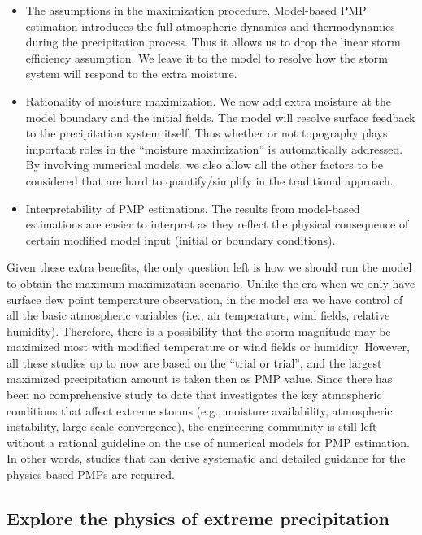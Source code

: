 \begin{itemize}
\item The assumptions in the maximization procedure. Model-based PMP estimation introduces the full atmospheric dynamics and thermodynamics during the precipitation process. Thus it allows us to drop the linear storm efficiency assumption. We leave it to the model to resolve how the storm system will respond to the extra moisture.

\item Rationality of moisture maximization. We now add extra moisture at the model boundary and the initial fields. The model will resolve surface feedback to the precipitation system itself. Thus whether or not topography plays important roles in the ``moisture maximization'' is automatically addressed. By involving numerical models, we also allow all the other factors to be considered that are hard to quantify/simplify in the traditional approach.

\item Interpretability of PMP estimations. The results from model-based estimations are easier to interpret as they reflect the physical consequence of certain modified model input (initial or boundary conditions).
\end{itemize}

Given these extra benefits, the only question left is how we should run the model to obtain the maximum maximization scenario. Unlike the era when we only have surface dew point temperature observation, in the model era we have control of all the basic atmospheric variables (i.e., air temperature, wind fields, relative humidity). Therefore, there is a possibility that the storm magnitude may be maximized most with modified temperature or wind fields or humidity. However, all these studies up to now are based on the ``trial or trial'', and the largest maximized precipitation amount is taken then as PMP value. Since there has been no comprehensive study to date that investigates the key atmospheric conditions that affect extreme storms (e.g., moisture availability, atmospheric instability, large-scale convergence), the engineering community is still left without a rational guideline on the use of numerical models for PMP estimation. In other words, studies that can derive systematic and detailed guidance for the physics-based PMPs are required.

\subsection{Explore the physics of extreme precipitation}


